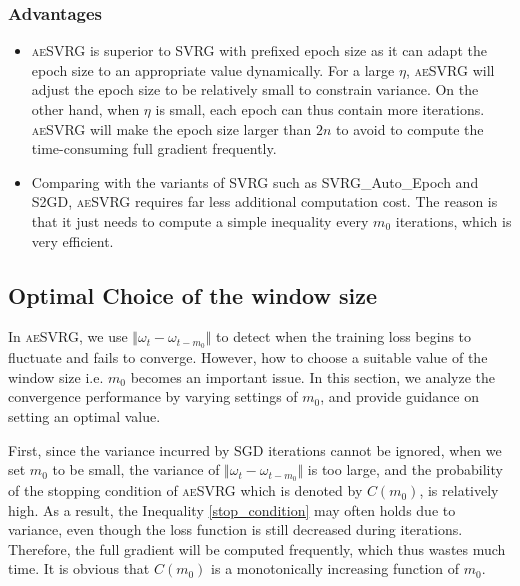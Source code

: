 \documentclass[conference]{IEEEtran}
\begin{document}
\begin{algorithm}[t]
\subsubsection{Advantages}
\begin{itemize}
\item \textsc{aeSVRG} is superior to SVRG with prefixed epoch size as it can adapt the epoch size to an appropriate value dynamically. For a large $\eta$, \textsc{aeSVRG} will adjust the epoch size to be relatively small to constrain variance. On the other hand, when $\eta$ is small, each epoch can thus contain more iterations. \textsc{aeSVRG} will make the epoch size larger than $2n$ to avoid to compute the time-consuming full gradient frequently.
\item Comparing with the variants of SVRG such as SVRG\_Auto\_Epoch and S2GD, \textsc{aeSVRG} requires far less additional computation cost. The reason is that it just needs to compute a simple inequality every $m_0$ iterations, which is very efficient.
\end{itemize}
 
 \subsection{Optimal Choice of the window size}
 \label{m0_analysis}
 In \textsc{aeSVRG}, we use $\Vert\omega_{t}-\omega_{t-m_0}\Vert$ to detect when the training loss begins to fluctuate and fails to converge. However, how to choose a suitable value of the window size i.e. $m_0$ becomes an important issue. In this section, we analyze the convergence performance by varying settings of $m_0$, and provide guidance on setting an optimal value.
 
 First, since the variance incurred by SGD iterations cannot be ignored, when we set $m_0$ to be small, the variance of $\Vert\omega_{t}-\omega_{t-m_0}\Vert$ is too large, and  the probability of the stopping condition of \textsc{aeSVRG} which is denoted by $C(m_0)$, is relatively high. As a result, the Inequality \ref{stop_condition} may often holds due to variance, even though the loss function is still decreased during iterations. Therefore, the full gradient will be computed frequently, which thus wastes much time.  It is obvious that $C(m_0)$ is a monotonically increasing function of $m_0$.
 

\end{algorithm}
\end{document}
